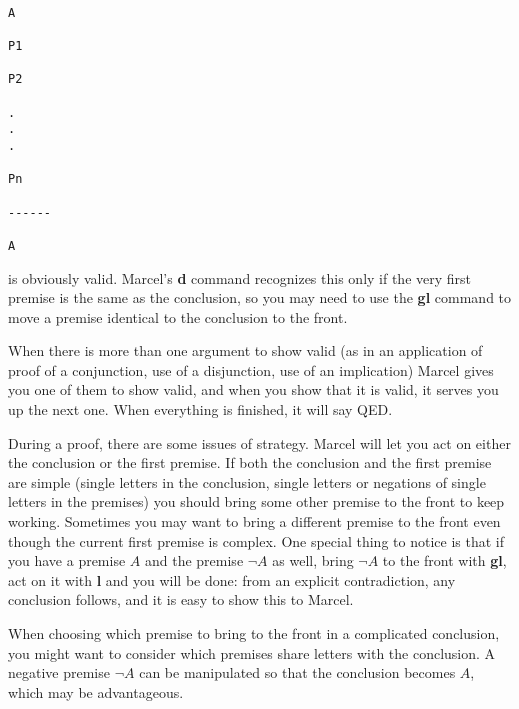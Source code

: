 \documentclass[12pt]{article}
\begin{document}
\begin{verbatim}

A

P1

P2

.
.
.

Pn

------

A

\end{verbatim}

is obviously valid.  Marcel's {\bf d} command recognizes this only if the very first premise is the same as the conclusion, so you may need to use the {\bf gl} command
to move a premise identical to the conclusion to the front.

When there is more than one argument to show valid (as in an application of proof of a conjunction, use of a disjunction, use of an implication)  Marcel gives you one of them to show valid,
and when you show that it is valid, it serves you up the next one.  When everything is finished, it will say QED.

During a proof, there are some issues of strategy.  Marcel will let you act on either the conclusion or the first premise.  If both the conclusion and the first premise are simple (single letters in the
conclusion, single letters or negations of single letters in the premises)  you should bring some other premise to the front to keep working.  Sometimes you may want to bring a different premise to the front even though the current first premise is complex.  One special thing to notice is that if you have a premise $A$
and the premise $\neg A$ as well, bring $\neg A$ to the front with {\bf gl}, act on it with {\bf l} and you will be done:  from an explicit contradiction, any conclusion follows, and it is easy to show this to Marcel.

When choosing which premise to bring to the front in a complicated conclusion, you might want to consider which premises share letters with the conclusion.  A negative premise $\neg A$ can be manipulated so
that the conclusion becomes $A$, which may be advantageous.
\end{document}
